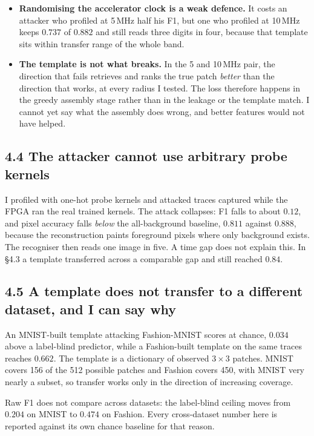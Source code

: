 \documentclass[11pt,a4paper]{article}
\begin{document}
\begin{itemize}
\item \textbf{Randomising the accelerator clock is a weak defence.} It costs an attacker
      who profiled at 5\,MHz half his F1, but one who profiled at 10\,MHz keeps $0.737$
      of $0.882$ and still reads three digits in four, because that template sits within
      transfer range of the whole band.
\item \textbf{The template is not what breaks.} In the 5 and 10\,MHz pair, the direction
      that fails retrieves and ranks the true patch \emph{better} than the direction that
      works, at every radius I tested. The loss therefore happens in the greedy assembly
      stage rather than in the leakage or the template match. I cannot yet say what the
      assembly does wrong, and better features would not have helped.
\end{itemize}

\subsection*{4.4 The attacker cannot use arbitrary probe kernels}

I profiled with one-hot probe kernels and attacked traces captured while the FPGA ran the
real trained kernels. The attack collapses: F1 falls to about $0.12$, and pixel accuracy
falls \emph{below} the all-background baseline, $0.811$ against $0.888$, because the
reconstruction paints foreground pixels where only background exists. The recogniser then
reads one image in five. A time gap does not explain this. In \S4.3 a template transferred
across a comparable gap and still reached $0.84$.

\subsection*{4.5 A template does not transfer to a different dataset, and I can say why}

An MNIST-built template attacking Fashion-MNIST scores at chance, $0.034$ above a
label-blind predictor, while a Fashion-built template on the same traces reaches $0.662$.
The template is a dictionary of observed $3\times3$ patches. MNIST covers 156 of the 512
possible patches and Fashion covers 450, with MNIST very nearly a subset, so transfer
works only in the direction of increasing coverage.

Raw F1 does not compare across datasets: the label-blind ceiling moves from $0.204$ on
MNIST to $0.474$ on Fashion. Every cross-dataset number here is reported against its own
chance baseline for that reason.
\end{document}
